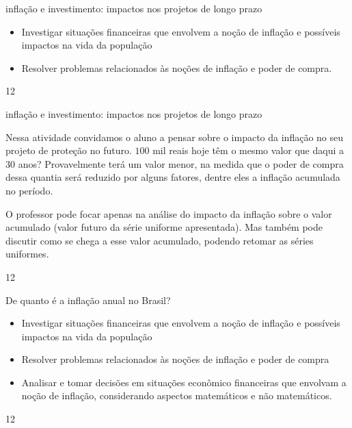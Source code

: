 \clearpage
\def\currentcolor{session2}
\begin{objectives}{inflação e investimento: impactos nos projetos de longo prazo}
{
\begin{itemize}
\item Investigar situações financeiras que envolvem a noção de inflação e possíveis impactos na vida da população
\item Resolver problemas relacionados às noções de inflação e poder de compra.
\end{itemize}

}{1}{2}
\end{objectives}
\marginpar{\vspace{-2.5em}}
\begin{sugestions}{inflação e investimento: impactos nos projetos de longo prazo}
{
Nessa atividade convidamos o aluno a pensar sobre o impacto da inflação no seu projeto de proteção no futuro. $100$ mil reais hoje têm o mesmo valor que daqui a 30 anos? Provavelmente terá um valor menor, na medida que o poder de compra dessa quantia será reduzido por alguns fatores, dentre eles a inflação acumulada no período.

O professor pode focar apenas na análise do impacto da inflação sobre o valor acumulado (valor futuro da série uniforme apresentada). Mas também pode discutir como se chega a esse valor acumulado, podendo retomar as séries uniformes. 

}{1}{2}
\end{sugestions}
\marginpar{\vspace{-1em}}
\begin{objectives}{De quanto é a inflação anual no Brasil?}
{
\begin{itemize}
\item Investigar situações financeiras que envolvem a noção de inflação e possíveis impactos na vida da população
\item Resolver problemas relacionados às noções de inflação e poder de compra
\item Analisar e tomar decisões em situações econômico financeiras que envolvam a noção de inflação, considerando aspectos matemáticos e não matemáticos.
\end{itemize}
}{1}{2}
\end{objectives}
